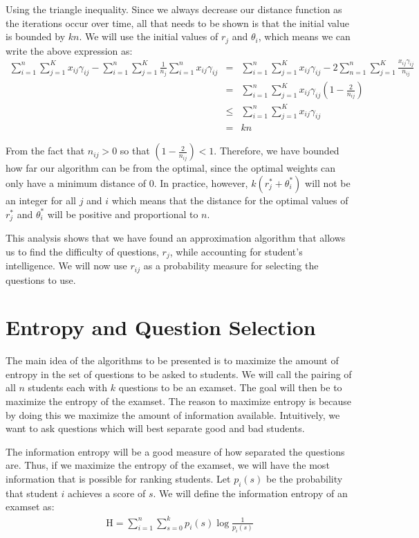 \documentclass[psamsfonts]{amsart}
\begin{document}
Using the triangle inequality. Since we always decrease our distance function as the iterations occur over time, all that needs to be shown is that the initial value is bounded by $kn$. We will use the initial values of $r_j$ and $\theta_i$, which means we can write the above expression as: 
\begin{eqnarray}
\sum_{i=1}^n \sum_{j=1}^K x_{ij} \gamma_{ij} - \sum_{i=1}^n \sum_{j=1}^K \frac{1}{n_j} \sum_{i=1}^n x_{ij} \gamma_{ij} &=& \sum_{i=1}^n \sum_{j=1}^K x_{ij} \gamma_{ij} - 2 \sum_{n=1}^n \sum_{j=1}^K \frac{x_{ij} \gamma_{ij}}{n_{ij}} \\ 
&=& \sum_{i=1}^n \sum_{j=1}^K x_{ij} \gamma_{ij} \left( 1 - \frac{2}{n_{ij}} \right) \\
&\leq& \sum_{i=1}^n \sum_{j=1}^K x_{ij} \gamma_{ij} \\
&=& kn
\end{eqnarray}

From the fact that $n_{ij} > 0$ so that $(1 - \frac{2}{n_{ij}} )< 1$. Therefore, we have bounded how far our algorithm can be from the optimal, since the optimal weights can only have a minimum distance of 0. In practice, however, $k(r^*_j + \theta^*_i)$ will not be an integer for all $j$ and $i$ which means that the distance for the optimal values of $r^*_j$ and $\theta^*_i$ will be positive and proportional to $n$. 

This analysis shows that we have found an approximation algorithm that allows us to find the difficulty of questions, $r_{j}$, while accounting for student's intelligence. We will now use $r_{ij}$ as a probability measure for selecting the questions to use.

\section{Entropy and Question Selection}

The main idea of the algorithms to be presented is to maximize the amount of entropy in the set of questions to be asked to students. We will call the pairing of all $n$ students each with $k$ questions to be an examset. The goal will then be to maximize the entropy of the examset. The reason to maximize entropy is because by doing this we maximize the amount of information available. Intuitively, we want to ask questions which will best separate good and bad students.

The information entropy will be a good measure of how separated the questions are. Thus, if we maximize the entropy of the examset, we will have the most information that is possible for ranking students. Let $p_{i}(s)$ be the probability that student $i$ achieves a score of $s$. We will define the information entropy of an examset as:
\begin{eqnarray}
\mathrm{H} = \sum_{i=1}^n \sum_{s=0}^k p_{i}(s) \log \frac{1}{p_i(s)}
\end{eqnarray}
\end{document}
